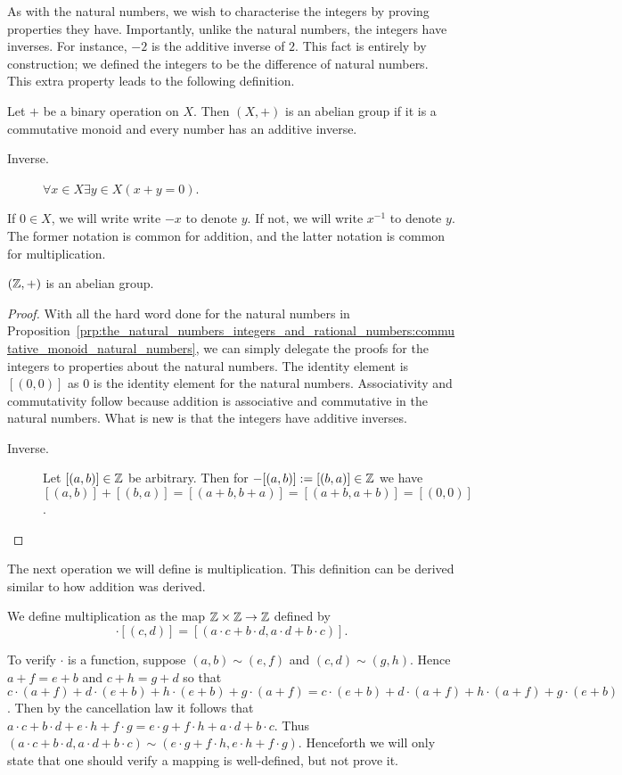\documentclass[../main.tex]{subfiles}
\begin{document}
As with the natural numbers, we wish to characterise the integers by proving properties they have. Importantly, unlike the natural numbers, the integers have inverses. For instance, $-2$ is the additive inverse of $2$. This fact is entirely by construction; we defined the integers to be the difference of natural numbers. This extra property leads to the following definition.
\begin{definition}
    Let $+$ be a binary operation on $X$. Then $(X,+)$ is an abelian group if it is a commutative monoid and every number has an additive inverse.
    \begin{description}
        \item[Inverse.] $\forall x\in X\exists y\in X(x+y=0)$.
    \end{description}
    If $0\in X$, we will write write $-x$ to denote $y$. If not, we will write $x^{-1}$ to denote $y$. The former notation is common for addition, and the latter notation is common for multiplication.
\end{definition}
\begin{proposition}\label{prp:the_natural_numbers_integers_and_rational_numbers:abelian_group_integers}
    $(\mathbb{Z},+)$ is an abelian group.
\end{proposition}
\begin{proof}
    With all the hard word done for the natural numbers in Proposition~\ref{prp:the_natural_numbers_integers_and_rational_numbers:commutative_monoid_natural_numbers}, we can simply delegate the proofs for the integers to properties about the natural numbers. The identity element is $[(0,0)]$ as $0$ is the identity element for the natural numbers. Associativity and commutativity follow because addition is associative and commutative in the natural numbers. What is new is that the integers have additive inverses.
    \begin{description}
        \item[Inverse.] Let $[(a,b)]\in\mathbb{Z}$ be arbitrary. Then for $-[(a,b)]:=[(b,a)]\in\mathbb{Z}$ we have $[(a,b)]+[(b,a)]=[(a+b,b+a)]=[(a+b,a+b)]=[(0,0)]$.
    \end{description}
\end{proof}
The next operation we will define is multiplication. This definition can be derived similar to how addition was derived.
\begin{definition}
    We define multiplication as the map $\mathbb{Z}\times\mathbb{Z}\to\mathbb{Z}$ defined by
    \begin{equation*}
        [(a,b)]\cdot[(c,d)]=[(a\cdot c+b\cdot d,a\cdot d+b\cdot c)].
    \end{equation*}
\end{definition}
To verify $\cdot$ is a function, suppose $(a,b)\sim(e,f)$ and $(c,d)\sim(g,h)$. Hence $a+f=e+b$ and $c+h=g+d$ so that $c\cdot(a+f)+d\cdot(e+b)+h\cdot(e+b)+g\cdot(a+f)=c\cdot(e+b)+d\cdot(a+f)+h\cdot(a+f)+g\cdot(e+b)$. Then by the cancellation law it follows that $a\cdot c+b\cdot d+e\cdot h+f\cdot g=e\cdot g+f\cdot h+a\cdot d+b\cdot c$. Thus $(a\cdot c+b\cdot d,a\cdot d+b\cdot c)\sim(e\cdot g+f\cdot h,e\cdot h+f\cdot g)$. Henceforth we will only state that one should verify a mapping is well-defined, but not prove it.
\end{document}

